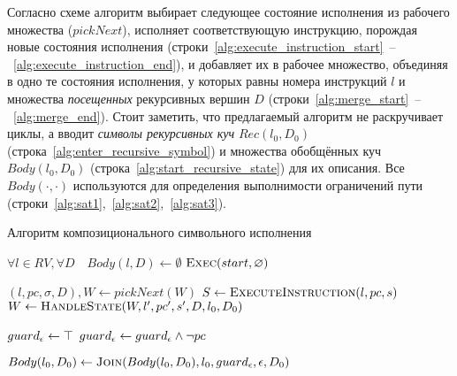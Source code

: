 Согласно схеме алгоритм выбирает следующее состояние исполнения из рабочего множества ($pickNext$), 
исполняет соответствующую инструкцию, порождая новые состояния исполнения 
(строки~\ref{alg:execute_instruction_start}~--~\ref{alg:execute_instruction_end}), и добавляет их в рабочее множество, 
объединяя в одно те состояния исполнения, у которых равны номера инструкций $l$ и множества \emph{посещенных} рекурсивных вершин $D$
(строки~\ref{alg:merge_start}~--~\ref{alg:merge_end}).
Стоит заметить, что предлагаемый алгоритм не раскручивает циклы, 
а вводит \emph{символы рекурсивных куч} $Rec(l_0, D_0)$ (строка~\ref{alg:enter_recursive_symbol})
и множества обобщённых куч $Body(l_0,D_0)$ (строка~\ref{alg:start_recursive_state}) для их описания.
Все $Body(\cdot,\cdot)$ используются для определения выполнимости ограничений пути 
(строки~\ref{alg:sat1},~\ref{alg:sat2},~\ref{alg:sat3}).

\begin{algorithm}
    \caption{Алгоритм композиционального символьного исполнения}\label{compositional_algo}
\begin{algorithmic}[1]
    \State $\forall l \in RV, \forall D \quad Body(l,D) \gets \emptyset$
    \State \Return $\text{$\textsc{Exec}(start,\emptyset)$}$ \label{alg:start_vertex}
    
         \label{alg:while_start}
            \State $(l,pc,\sigma,D), W \gets pickNext(W)$
            \State $S \gets \textsc{ExecuteInstruction}(l,pc,s)$
                \State $W \gets \textsc{HandleState}(W, l',pc',s', D, l_0, D_0)$
            \EndFor
        \EndWhile \label{alg:while_end}
    
            \State $guard_{\emptyheap} \gets \top$ \label{alg:epsilon_equation_start}
               \State $guard_{\emptyheap} \gets guard_{\emptyheap} \land \lnot pc$
            \EndFor

            \State $Body(l_0,D_0) \gets \textsc{Join}(Body(l_0,D_0), l_0, guard_{\emptyheap}, \emptyheap, D_0)$ \label{alg:epsilon_equation_end}
        \Else
                \label{alg:print_errors}\;  
        \EndIf
    \EndProcedure
\end{algorithmic}
\end{algorithm}

